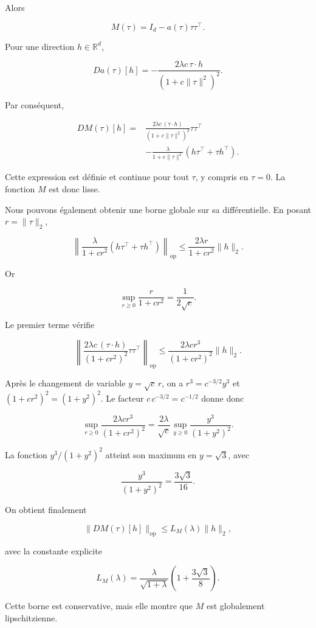 Alors

\[
M(\tau)=I_d-a(\tau)\tau\tau^\top.
\]

Pour une direction \(h\in\mathbb R^d\),

\[
Da(\tau)[h]
=
-\frac{2\lambda c\,\tau\cdot h}
{\left(1+c\|\tau\|^2\right)^2}.
\]

Par conséquent,

\[
\begin{aligned}
DM(\tau)[h]
={}&
\frac{2\lambda c\,(\tau\cdot h)}
{\left(1+c\|\tau\|^2\right)^2}
\tau\tau^\top
\\
&-
\frac{\lambda}
{1+c\|\tau\|^2}
\left(
h\tau^\top+\tau h^\top
\right).
\end{aligned}
\]

Cette expression est définie et continue pour tout \(\tau\), y
compris en \(\tau=0\). La fonction \(M\) est donc lisse.

Nous pouvons également obtenir une borne globale sur sa différentielle.
En posant \(r=\|\tau\|_2\),

\[
\left\|
\frac{\lambda}
{1+cr^2}
\left(
h\tau^\top+\tau h^\top
\right)
\right\|_{\mathrm{op}}
\leq
\frac{2\lambda r}{1+cr^2}\|h\|_2.
\]

Or

\[
\sup_{r\geq0}\frac{r}{1+cr^2}
=
\frac{1}{2\sqrt c}.
\]

Le premier terme vérifie

\[
\left\|
\frac{2\lambda c\,(\tau\cdot h)}
{(1+cr^2)^2}
\tau\tau^\top
\right\|_{\mathrm{op}}
\leq
\frac{2\lambda c r^3}{(1+cr^2)^2}
\|h\|_2.
\]

Après le changement de variable \(y=\sqrt c\,r\), on a
\(r^3=c^{-3/2}y^3\) et \((1+cr^2)^2=(1+y^2)^2\). Le facteur
\(c\,c^{-3/2}=c^{-1/2}\) donne donc

\[
\sup_{r\geq0}
\frac{2\lambda c r^3}{(1+cr^2)^2}
=
\frac{2\lambda}{\sqrt c}
\sup_{y\geq0}
\frac{y^3}{(1+y^2)^2}.
\]

La fonction \(y^3/(1+y^2)^2\) atteint son maximum en
\(y=\sqrt3\), avec

\[
\frac{y^3}{(1+y^2)^2}
=
\frac{3\sqrt3}{16}.
\]

On obtient finalement

\[
\boxed{
\|DM(\tau)[h]\|_{\mathrm{op}}
\leq
L_M(\lambda)\|h\|_2,
}
\]

avec la constante explicite

\[
\boxed{
L_M(\lambda)
=
\frac{\lambda}{\sqrt{1+\lambda}}
\left(
1+\frac{3\sqrt3}{8}
\right).
}
\]

Cette borne est conservative, mais elle montre que \(M\) est
globalement lipschitzienne.

